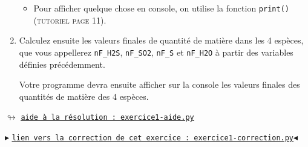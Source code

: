 \documentclass[11pt]{article}
\begin{document}
\begin{enumerate}
\begin{itemize}
\item Pour afficher quelque chose en console, on utilise la fonction \texttt{print()} (\textsc{tutoriel page 11}).
 
 \end{itemize}
 
 
 
\medskip
 
 
 \item Calculez ensuite les valeurs finales de quantité de matière dans les 4 espèces, que vous appellerez \texttt{nF\_H2S}, \texttt{nF\_SO2}, \texttt{nF\_S} et \texttt{nF\_H2O} à partir des variables définies précédemment. 
 
 \smallskip
 
 Votre programme devra ensuite afficher sur la console les valeurs finales des quantités de matière des 4 espèces.
 
 \end{enumerate}
 
 
 
 \begin{comment}
 
>>>>>>>>>>>>>>>>>>>>>>>>>>>>>>>>>>>>>>>> EN COMPLÉMENT
 
 \item \textcolor{red}{\textbf{(optionnel)}} : Tracez ensuite un graphe représentant l'évolution des quantités de matière des 4 espèces en fonction de l'avancement $x$ de la réaction. On limitera les axes aux valeurs minimales et maximales possibles. Légendez ce graphe, donnez-lui un titre, nommez les axes.
\end{enumerate}

\end{comment}


\begin{center}
 $\looparrowright$ \href{https://github.com/formationPythonPC-Juin/aides-formation/blob/master/exercice1-aide.py}{\underline{\texttt{aide à la résolution : exercice1-aide.py}}}
\end{center}

\bigskip

\bigskip


\begin{center}
$\blacktriangleright$ \href{https://github.com/formationPythonPC-Juin/corrections-formation/blob/master/exercice1-correction.py}{\underline{\texttt{lien vers la correction de cet exercice : exercice1-correction.py}}}$\blacktriangleleft$                                                                                                                                                                    \end{center}
\end{document}
